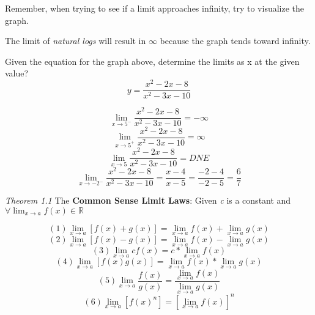 \documentclass{book}
\begin{document}
\noindent Remember, when trying to see if a limit approaches infinity, try to visualize the graph.\\
\begin{center}
\end{center}
The limit of \emph{natural logs} will result in $\infty$ because the graph tends toward infinity.
\begin{center}
\end{center}
Given the equation for the graph above, determine the limits as x at the given value?
$$y=\frac{x^2 - 2x - 8}{x^2 - 3x - 10}$$ 
\begin{center}
	$$ \lim_{x \to 5^-} \frac{x^2 - 2x - 8}{x^2 - 3x - 10} = - \infty $$
	$$ \lim_{x \to 5^+} \frac{x^2 - 2x - 8}{x^2 - 3x - 10} = \infty $$
	$$ \lim_{x \to 5} \frac{x^2 - 2x - 8}{x^2 - 3x - 10} = DNE $$
	$$ \lim_{x \to -2^-} \frac{x^2 - 2x - 8}{x^2 - 3x - 10} = \frac{x - 4}{x - 5}  = \frac{-2 - 4}{-2 - 5}  = \frac{6}{7} $$
\end{center}

\noindent\emph{Theorem 1.1} The \textbf{Common Sense Limit Laws}: Given \emph{c} is a constant and $\forall \lim_{x \to a} f(x) \in \mathbb{R}$ 
\begin{center}
	$$ (1) \lim_{x \to a} [f(x) + g(x)] = \lim_{x \to a} f(x) + \lim_{x \to a} g(x) $$
	$$ (2) \lim_{x \to a} [f(x) - g(x)] = \lim_{x \to a} f(x) - \lim_{x \to a} g(x) $$
	$$ (3) \lim_{x \to a} cf(x) = c * \lim_{x \to a} f(x) $$
	$$ (4) \lim_{x \to a} [f(x)g(x)] = \lim_{x \to a} f(x) * \lim_{x \to a} g(x) $$
	$$ (5) \lim_{x \to a} \frac{f(x)}{g(x)} = \frac{\lim_{x \to a} f(x)}{\lim_{x \to a} g(x)} $$
	$$ (6) \lim_{x \to a} [f(x)^n] = [\lim_{x \to a} f(x)]^n $$
\end{center}
\end{document}
